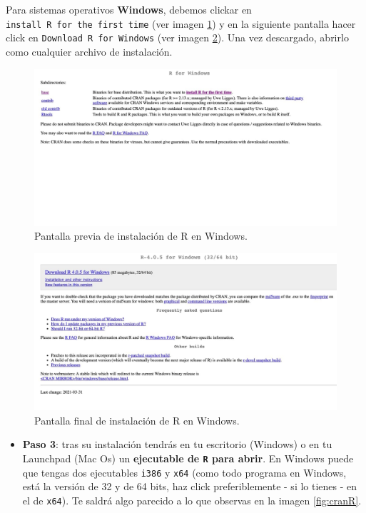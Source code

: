 \documentclass[11pt,]{book}
\providecommand{\tightlist}{%
  \setlength{\itemsep}{0pt}\setlength{\parskip}{0pt}}
\begin{document}
Para sistemas operativos \textbf{Windows}, debemos clickar en \texttt{install\ R\ for\ the\ first\ time} (ver imagen \ref{fig:pantalla-windows-1}) y en la siguiente pantalla hacer click en \texttt{Download\ R\ for\ Windows} (ver imagen \ref{fig:pantalla-windows-2}). Una vez descargado, abrirlo como cualquier archivo de instalación.

\begin{figure}

{\centering \includegraphics[width=0.8\linewidth]{./img/pantalla_windows_1} 

}

\caption{Pantalla previa de instalación de R en Windows.}\label{fig:pantalla-windows-1}
\end{figure}

\begin{figure}

{\centering \includegraphics[width=0.9\linewidth]{./img/pantalla_windows_2} 

}

\caption{Pantalla final de instalación de R en Windows.}\label{fig:pantalla-windows-2}
\end{figure}

\begin{itemize}
\tightlist
\item
  \textbf{Paso 3}: tras su instalación tendrás en tu escritorio (Windows) o en tu Launchpad (Mac Os) un \textbf{ejecutable de \texttt{R} para abrir}. En Windows puede que tengas dos ejecutables \texttt{i386} y \texttt{x64} (como todo programa en Windows, está la versión de 32 y de 64 bits, haz click preferiblemente - si lo tienes - en el de \texttt{x64}). Te saldrá algo parecido a lo que observas en la imagen \ref{fig:cranR}.
\end{itemize}
\end{document}
